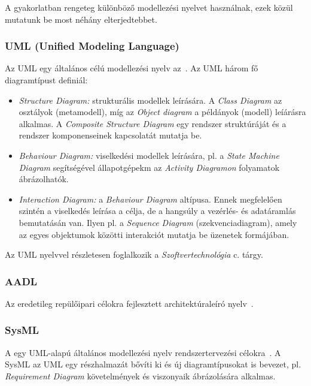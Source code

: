 A gyakorlatban rengeteg különböző modellezési nyelvet használnak, ezek közül mutatunk be most néhány elterjedtebbet.

\subsubsection{UML (Unified Modeling Language)}

Az UML egy általános célú modellezési nyelv az~\cite{UML}. Az UML három fő diagramtípust definiál:

\begin{itemize}
	\item \emph{Structure Diagram:} strukturális modellek leírására. A \emph{Class Diagram} az osztályok (metamodell), míg az \emph{Object diagram} a példányok (modell) leíárásra alkalmas. A \emph{Composite Structure Diagram} egy rendszer struktúráját és a rendszer komponenseinek kapcsolatát mutatja be.
	\item \emph{Behaviour Diagram:} viselkedési modellek leírására, pl. a \emph{State Machine Diagram} segítségével állapotgépekm az \emph{Activity Diagramon} folyamatok ábrázolhatók.
	\item \emph{Interaction Diagram:} a \emph{Behaviour Diagram} altípusa. Ennek megfelelően szintén a viselkedés leírása a célja, de a hangsúly a vezérlés- és adatáramlás bemutatásán van. Ilyen pl. a \emph{Sequence Diagram} (szekvenciadiagram), amely az egyes objektumok közötti interakciót mutatja be üzenetek formájában.
\end{itemize}


Az UML nyelvvel részletesen foglalkozik a \emph{Szoftvertechnológia} c. tárgy.

\subsubsection{AADL}

Az  eredetileg repülőipari célokra fejlesztett architektúraleíró nyelv~\cite{AADL}.

\subsubsection{SysML}

A  egy UML-alapú általános modellezési nyelv rendszertervezési célokra~\cite{SysML}. A SysML az UML egy részhalmazát bővíti ki és új diagramtípusokat is bevezet, pl. \emph{Requirement Diagram} követelmények és viszonyaik ábrázolására alkalmas.

